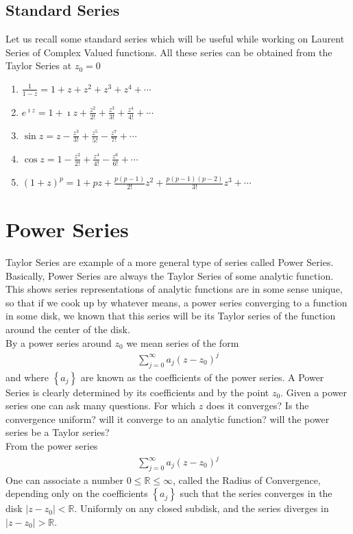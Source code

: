 \documentclass[12pt]{report}
\newcommand{\dsp}{\displaystyle}
\newcommand{\NI}{\noindent}
\newcommand{\real}{ \mathbb{R}}
\newcommand{\imaginary}{\imath}
\begin{document}
	\subsection{Standard Series}
	Let us recall some standard series which will be useful while working on Laurent Series of Complex Valued functions. All these series can be obtained from the Taylor Series at $z_0 = 0$
	\begin{enumerate}
		\item $\dsp \frac{1}{1-z}=1+z+z^2 + z^3 + z^4 + \cdots$
		\item $\dsp e^{\imaginary z} = 1+\imaginary z + \frac{z^2}{2!} + \frac{z^3}{3!} + \frac{z^4}{4!} + \cdots$
		\item $\dsp \sin z = z - \frac{z^3}{3!} + \frac{z^5}{5!} - \frac{z^7}{7!} + \cdots$
		\item $\dsp \cos z = 1 - \frac{z^2}{2!} + \frac{z^4}{4!} - \frac{z^6}{6!}+\cdots$
		\item $\dsp (1+z)^p = 1+ pz + \frac{p(p-1)}{2!}z^2 + \frac{p(p-1)(p-2)}{3!}z^3 + \cdots$
	\end{enumerate}
	
	\section{Power Series}
	Taylor Series are example of a more general type of series called Power Series. Basically, Power Series are always the Taylor Series of some analytic function. This shows series representations of analytic functions are in some sense unique, so that if we cook up by whatever means, a power series converging to a function in some disk, we known that this series will be its Taylor series of the function around the center of the disk.\\
	
	\NI By a power series around $z_0$ we mean series of the form
	\begin{eqnarray}
		\sum_{j=0}^{\infty}a_j(z-z_0)^j
	\end{eqnarray}
	and where $\left\{a_j\right\}$ are known as the coefficients of the power series. A Power Series is clearly determined by its coefficients and by the point $z_0$. Given a power series one can ask many questions. For which $z$ does it converges? Is the convergence uniform? will it converge to an analytic function? will the power series be a Taylor series?\\
	From the power series
	\begin{eqnarray*}
			\sum_{j=0}^{\infty}a_j(z-z_0)^j
	\end{eqnarray*}
	One can associate a number $0 \leq \real \leq \infty$, called the Radius of Convergence, depending only on the coefficients  $\left\{a_j\right\}$ such that the series converges in the disk $|z-z_0|< \real$. Uniformly on any closed subdisk, and the series diverges in $|z-z_0|> \real$.
	
\end{document}
